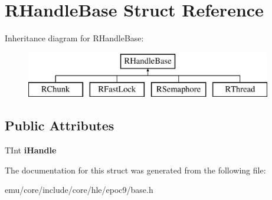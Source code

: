 \hypertarget{struct_r_handle_base}{}\section{R\+Handle\+Base Struct Reference}
\label{struct_r_handle_base}
Inheritance diagram for R\+Handle\+Base\+:\begin{figure}[H]
\begin{center}
\leavevmode
\includegraphics[height=2.000000cm]{struct_r_handle_base}
\end{center}
\end{figure}
\subsection*{Public Attributes}
\begin{DoxyCompactItemize}
\item 
\mbox{\label{struct_r_handle_base_aeab89dcc0c851c282effbbc9edea54f3}} 
T\+Int {\bfseries i\+Handle}
\end{DoxyCompactItemize}


The documentation for this struct was generated from the following file\+:\begin{DoxyCompactItemize}
\item 
emu/core/include/core/hle/epoc9/base.\+h\end{DoxyCompactItemize}
